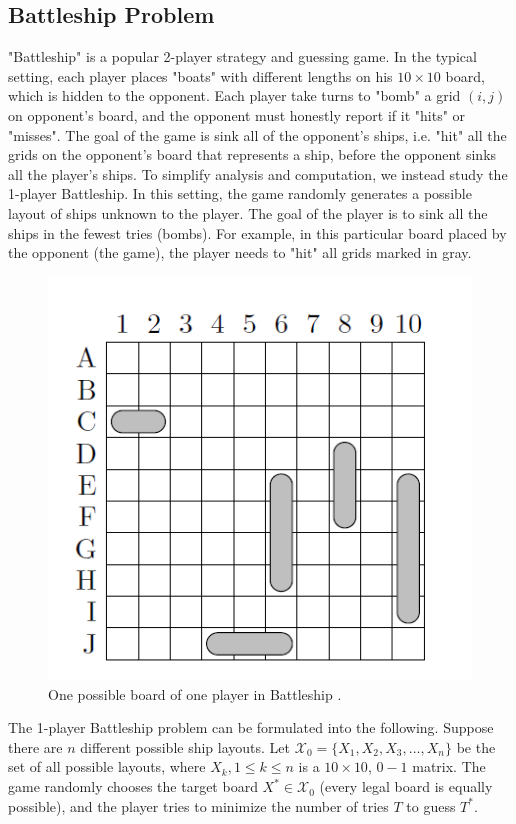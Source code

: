 \subsection{Battleship Problem}
"Battleship" is a popular 2-player strategy and guessing game. In the typical setting, each player places "boats" with different lengths on his $10\times 10$ board, which is hidden to the opponent. Each player take turns to "bomb" a grid $(i,j)$ on opponent's board, and the opponent must honestly report if it "hits" or "misses". The goal of the game is sink all of the opponent's ships, i.e. "hit" all the grids on the opponent's board that represents a ship, before the opponent sinks all the player's ships. 
To simplify analysis and computation, we instead study the 1-player Battleship. In this setting, the game randomly generates a possible layout of ships unknown to the player. The goal of the player is to sink all the ships in the fewest tries (bombs). 
For example, in this particular board placed by the opponent (the game), the player needs to "hit" all grids marked in gray.
\begin{figure}[H]\label{battleshipgame}
    \centering
    \includegraphics[scale=0.65]{figure/battleshipgame.png}
    \caption{One possible board of one player in Battleship
    \cite{battleshipoptimal}.}
\end{figure}

The 1-player Battleship problem can be formulated into the following. Suppose there are $n$ different possible ship layouts. Let $\mathcal{X}_0 = \{ X_1, X_2, X_3, \dots, X_n \}$ be the set of all possible layouts, where $X_k, 1\leq k \leq n$ is a $10\times 10$, $0-1$ matrix. The game randomly chooses the target board $X^{*} \in \mathcal{X}_0$ (every legal board is equally possible), and the player tries to minimize the number of tries $T$ to guess $T^{*}$.

